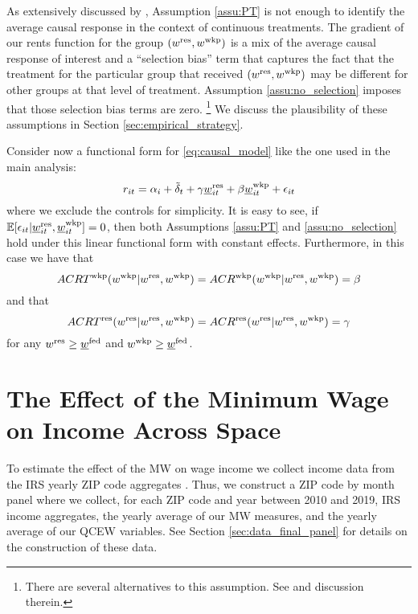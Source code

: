 As extensively discussed by \textcite{CallawayEtAl2021}, Assumption \ref{assu:PT} 
is not enough to identify the average causal response in the context of 
continuous treatments.
The gradient of our rents function for the group $(w^{\text{res}}, w^{\text{wkp}})$ is a mix
of the average causal response of interest and a ``selection bias'' term that
captures the fact that the treatment for the particular group that received
$(w^{\text{res}}, w^{\text{wkp}})$ may be different for other groups at that level of 
treatment.
Assumption \ref{assu:no_selection} imposes that those selection bias
terms are zero.%
\footnote{There are several alternatives to this assumption. 
See \textcite[][Section 3.3]{CallawayEtAl2021} and discussion therein.}
We discuss the plausibility of these assumptions in Section 
\ref{sec:empirical_strategy}.

Consider now a functional form for \eqref{eq:causal_model} like the one used in 
the main analysis:
$$
r_{it} = \alpha_i + \tilde\delta_t 
         + \gamma \underline{w}_{it}^{\text{res}} + \beta \underline{w}_{it}^{\text{wkp}}
         + \epsilon_{it}
$$
where we exclude the controls for simplicity.
It is easy to see, if 
$\operatorname{\mathbb{E}}[\epsilon_{it} | \underline{w}_{it}^{\text{res}}, \underline{w}_{it}^{\text{wkp}}] = 0$,
then both Assumptions \ref{assu:PT} and \ref{assu:no_selection} hold under 
this linear functional form with constant effects.
Furthermore, in this case we have that
\begin{equation*}
    ACRT^{\text{wkp}}(w^{\text{wkp}} | w^{\text{res}}, w^{\text{wkp}}) 
        = ACR^{\text{wkp}}(w^{\text{wkp}} | w^{\text{res}}, w^{\text{wkp}}) 
        = \beta
\end{equation*}
and that
\begin{equation*}
    ACRT^{\text{res}}(w^{\text{res}} | w^{\text{res}}, w^{\text{wkp}})
        = ACR^{\text{res}}(w^{\text{res}} | w^{\text{res}}, w^{\text{wkp}})
        = \gamma
\end{equation*}
for any $w^{\text{res}}\geq\underline{w}^{\text{fed}}$ and $w^{\text{wkp}}\geq\underline{w}^{\text{fed}}$.

\clearpage
\section{The Effect of the Minimum Wage on Income Across Space}
\label{sec:mw_on_income}

To estimate the effect of the MW on wage income we collect income data from the 
IRS yearly ZIP code aggregates \textcite{IRS}.
Thus, we construct a ZIP code by month panel where we collect, for each ZIP code
and year between 2010 and 2019, IRS income aggregates, the yearly average of our 
MW measures, and the yearly average of our QCEW variables. 
See Section \ref{sec:data_final_panel} for details on the construction of these 
data.

